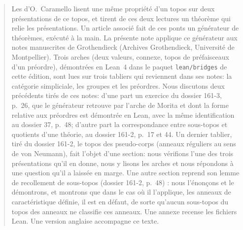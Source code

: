 \begin{abstract}
Les  d'O.~Caramello lisent une même propriété d'un topos sur deux présentations de ce topos, et tirent de ces deux lectures un théorème qui relie les présentations. Un article associé \cite{bridges-generator} fait de ces ponts un générateur de théorèmes, exécuté à la main. La présente note applique ce générateur aux notes manuscrites de Grothendieck (Archives Grothendieck, Université de Montpellier). Trois arches (deux valeurs, connexe, topos de préfaisceaux d'un préordre), démontrées en Lean~4 dans le paquet \texttt{lean/bridges} de cette édition, sont lues sur trois tabliers qui reviennent dans ses notes: la catégorie simpliciale, les groupes et les préordres. Nous discutons deux précédents tirés de ces notes: d'une part un exercice du dossier 161-3, p.~26, que le générateur retrouve par l'arche de Morita et dont la forme relative aux préordres est démontrée en Lean, avec la même identification au dossier 37, p.~48; d'autre part la correspondance entre sous-topos et quotients d'une théorie, au dossier 161-2, p.~17 et 44. Un dernier tablier, tiré du dossier 161-2, le topos des pseudo-corps (anneaux réguliers au sens de von Neumann), fait l'objet d'une section: nous vérifions l'une des trois présentations qu'il en donne, nous y lisons les arches et nous répondons à une question qu'il a laissée en marge. Une autre section reprend son lemme de recollement de sous-topos (dossier 161-2, p.~48) : nous l'énonçons et le démontrons, et montrons que dans le cas où il l'applique, les anneaux de caractéristique définie, il est en défaut, de sorte qu'aucun sous-topos du topos des anneaux ne classifie ces anneaux. Une annexe recense les fichiers Lean. Une version anglaise accompagne ce texte.
\end{abstract}
